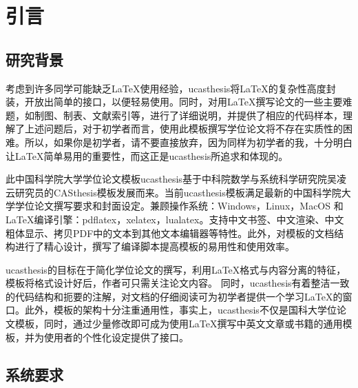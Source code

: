 \chapter{引言}\label{chap:introduction}

\section{研究背景}

考虑到许多同学可能缺乏\LaTeX{}使用经验，ucasthesis将\LaTeX{}的复杂性高度封装，开放出简单的接口，以便轻易使用。同时，对用\LaTeX{}撰写论文的一些主要难题，如制图、制表、文献索引等，进行了详细说明，并提供了相应的代码样本，理解了上述问题后，对于初学者而言，使用此模板撰写学位论文将不存在实质性的困难。所以，如果你是初学者，请不要直接放弃，因为同样为初学者的我，十分明白让\LaTeX{}简单易用的重要性，而这正是ucasthesis所追求和体现的。

此中国科学院大学学位论文模板ucasthesis基于中科院数学与系统科学研究院吴凌云研究员的CASthesis模板发展而来。当前ucasthesis模板满足最新的中国科学院大学学位论文撰写要求和封面设定。兼顾操作系统：Windows，Linux，MacOS 和\LaTeX{}编译引擎：pdflatex，xelatex，lualatex。支持中文书签、中文渲染、中文粗体显示、拷贝PDF中的文本到其他文本编辑器等特性。此外，对模板的文档结构进行了精心设计，撰写了编译脚本提高模板的易用性和使用效率。

ucasthesis的目标在于简化学位论文的撰写，利用\LaTeX{}格式与内容分离的特征，模板将格式设计好后，作者可只需关注论文内容。 同时，ucasthesis有着整洁一致的代码结构和扼要的注解，对文档的仔细阅读可为初学者提供一个学习\LaTeX{}的窗口。此外，模板的架构十分注重通用性，事实上，ucasthesis不仅是国科大学位论文模板，同时，通过少量修改即可成为使用\LaTeX{}撰写中英文文章或书籍的通用模板，并为使用者的个性化设定提供了接口。

\section{系统要求}\label{sec:system}

